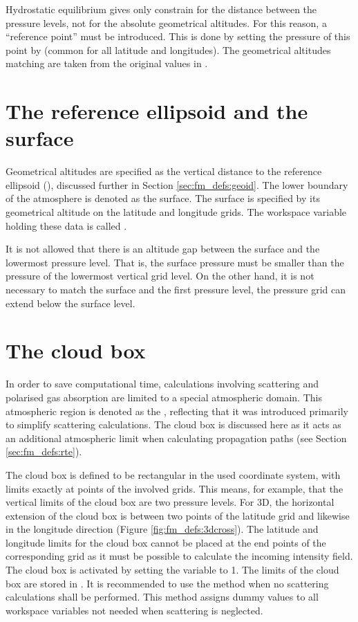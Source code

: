Hydrostatic equilibrium gives only constrain for the distance between the
pressure levels, not for the absolute geometrical altitudes. For this reason, a
``reference point'' must be introduced. This is done by setting the pressure of
this point by  (common for all latitude and longitudes). The
geometrical altitudes matching  are taken from the original
values in . 


\section{The reference ellipsoid and the surface}
\label{sec:fm_defs:surf}

Geometrical altitudes are specified as the vertical distance to the reference
ellipsoid (), discussed further in Section
\ref{sec:fm_defs:geoid}. The lower boundary of the atmosphere is denoted as the
surface. The surface is specified by its geometrical altitude on the latitude
and longitude grids. The workspace variable holding these data is called
.

It is not allowed that there is an altitude gap between the surface and
the lowermost pressure level.  That is, the surface pressure must be
smaller than the pressure of the lowermost vertical grid level. On
the other hand, it is not necessary to match the surface and the first
pressure level, the pressure grid can extend below the surface level.


\section{The cloud box}
\label{sec:fm_defs:cloudbox}
In order to save computational time, calculations involving scattering and
polarised gas absorption are limited to a special atmospheric domain. This
atmospheric region is denoted as the , reflecting that it
was introduced primarily to simplify scattering calculations. The cloud box is
discussed here as it acts as an additional atmospheric limit when calculating
propagation paths (see Section \ref{sec:fm_defs:rte}).

The cloud box is defined to be rectangular in the used coordinate
system, with limits exactly at points of the involved grids. This
means, for example, that the vertical limits of the cloud box are two
pressure levels. For 3D, the horizontal extension of the cloud box
is between two points of the latitude grid and likewise in the
longitude direction (Figure \ref{fig:fm_defs:3dcross}). The latitude
and longitude limits for the cloud box cannot be placed at the end
points of the corresponding grid as it must be possible to calculate
the incoming intensity field. The cloud box is activated by setting
the variable  to 1.  The limits of the cloud
box are stored in .  It is recommended to
use the method  when no scattering calculations
shall be performed. This method assigns dummy values to all workspace
variables not needed when scattering is neglected.

